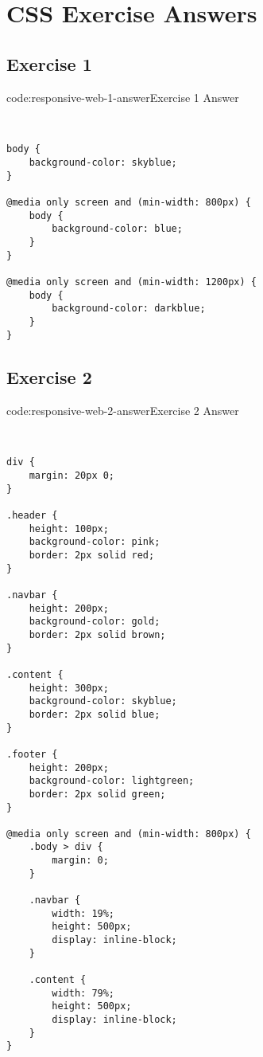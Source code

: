 \section{CSS Exercise Answers}\label{sect:css-exercise-answers}

\subsection*{Exercise 1}

\begin{codeenv}{code:responsive-web-1-answer}{Exercise 1 Answer}\begin{verbatim}


body {
    background-color: skyblue;
}

@media only screen and (min-width: 800px) {
    body {
        background-color: blue;
    }           
}

@media only screen and (min-width: 1200px) {
    body {
        background-color: darkblue;
    }           
}
\end{verbatim}
\end{codeenv}

\subsection*{Exercise 2}

\begin{codeenv}{code:responsive-web-2-answer}{Exercise 2 Answer}\begin{verbatim}


div {
    margin: 20px 0;
}

.header {
    height: 100px;
    background-color: pink;
    border: 2px solid red;
}

.navbar {
    height: 200px;
    background-color: gold;
    border: 2px solid brown;
}

.content {
    height: 300px;
    background-color: skyblue;
    border: 2px solid blue;
}

.footer {
    height: 200px;
    background-color: lightgreen;
    border: 2px solid green;
}

@media only screen and (min-width: 800px) {
    .body > div {
        margin: 0;
    }

    .navbar {
        width: 19%;
        height: 500px;
        display: inline-block;
    }

    .content {
        width: 79%;
        height: 500px;
        display: inline-block;
    }
}
\end{verbatim}
\end{codeenv}
